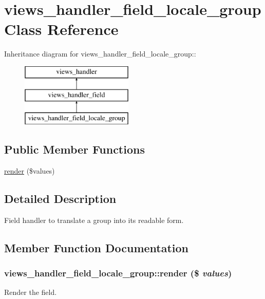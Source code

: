 \hypertarget{classviews__handler__field__locale__group}{
\section{views\_\-handler\_\-field\_\-locale\_\-group Class Reference}
\label{classviews__handler__field__locale__group}
}
Inheritance diagram for views\_\-handler\_\-field\_\-locale\_\-group::\begin{figure}[H]
\begin{center}
\leavevmode
\includegraphics[height=3cm]{classviews__handler__field__locale__group}
\end{center}
\end{figure}
\subsection*{Public Member Functions}
\begin{DoxyCompactItemize}
\item 
\hyperlink{classviews__handler__field__locale__group_ae1e6ec6ec1b2e071735ca54942bfde9b}{render} (\$values)
\end{DoxyCompactItemize}


\subsection{Detailed Description}
Field handler to translate a group into its readable form. 

\subsection{Member Function Documentation}
\hypertarget{classviews__handler__field__locale__group_ae1e6ec6ec1b2e071735ca54942bfde9b}{
\subsubsection[{render}]{\setlength{\rightskip}{0pt plus 5cm}views\_\-handler\_\-field\_\-locale\_\-group::render (\$ {\em values})}}
\label{classviews__handler__field__locale__group_ae1e6ec6ec1b2e071735ca54942bfde9b}
Render the field.



